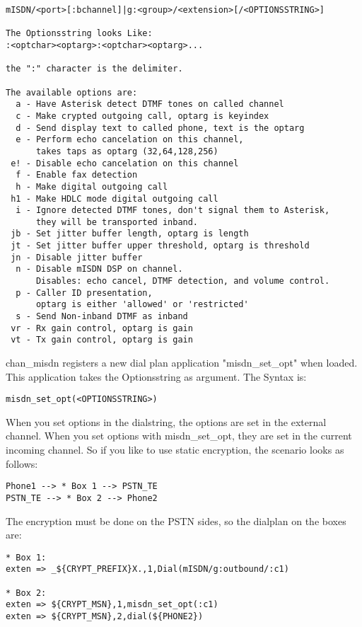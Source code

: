 \begin{astlisting}
\begin{verbatim}
mISDN/<port>[:bchannel]|g:<group>/<extension>[/<OPTIONSSTRING>]

The Optionsstring looks Like:
:<optchar><optarg>:<optchar><optarg>...

the ":" character is the delimiter.

The available options are:
  a - Have Asterisk detect DTMF tones on called channel
  c - Make crypted outgoing call, optarg is keyindex
  d - Send display text to called phone, text is the optarg
  e - Perform echo cancelation on this channel,
      takes taps as optarg (32,64,128,256)
 e! - Disable echo cancelation on this channel
  f - Enable fax detection
  h - Make digital outgoing call
 h1 - Make HDLC mode digital outgoing call
  i - Ignore detected DTMF tones, don't signal them to Asterisk,
      they will be transported inband.
 jb - Set jitter buffer length, optarg is length
 jt - Set jitter buffer upper threshold, optarg is threshold
 jn - Disable jitter buffer
  n - Disable mISDN DSP on channel.
      Disables: echo cancel, DTMF detection, and volume control.
  p - Caller ID presentation,
      optarg is either 'allowed' or 'restricted'
  s - Send Non-inband DTMF as inband
 vr - Rx gain control, optarg is gain
 vt - Tx gain control, optarg is gain
\end{verbatim}
\end{astlisting}

chan\_misdn registers a new dial plan application "misdn\_set\_opt" when
loaded. This application takes the Optionsstring as argument. The Syntax is:

\begin{verbatim}
misdn_set_opt(<OPTIONSSTRING>)
\end{verbatim}

When you set options in the dialstring, the options are set in the external
channel. When you set options with misdn\_set\_opt, they are set in the current
incoming channel. So if you like to use static encryption, the scenario looks
as follows:

\begin{verbatim}
Phone1 --> * Box 1 --> PSTN_TE
PSTN_TE --> * Box 2 --> Phone2
\end{verbatim}

The encryption must be done on the PSTN sides, so the dialplan on the boxes
are:

\begin{verbatim}
* Box 1:
exten => _${CRYPT_PREFIX}X.,1,Dial(mISDN/g:outbound/:c1)

* Box 2:
exten => ${CRYPT_MSN},1,misdn_set_opt(:c1)
exten => ${CRYPT_MSN},2,dial(${PHONE2})
\end{verbatim}


